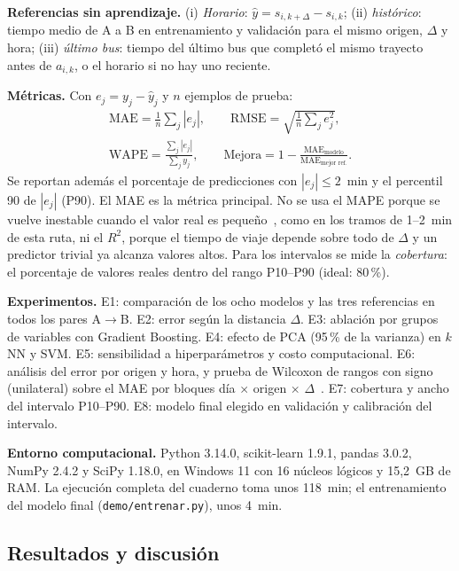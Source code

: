 \documentclass[conference,a4paper]{IEEEtran}
\begin{document}
\textbf{Referencias sin aprendizaje.} (i) \emph{Horario}: $\hat{y} = s_{i,k+\Delta} - s_{i,k}$; (ii) \emph{histórico}: tiempo medio de A a B en entrenamiento y validación para el mismo origen, $\Delta$ y hora; (iii) \emph{último bus}: tiempo del último bus que completó el mismo trayecto antes de $a_{i,k}$, o el horario si no hay uno reciente.

\textbf{Métricas.} Con $e_j = y_j - \hat{y}_j$ y $n$ ejemplos de prueba:
\begin{gather}
\text{MAE} = \tfrac{1}{n}\textstyle\sum_j |e_j|, \qquad
\text{RMSE} = \sqrt{\tfrac{1}{n}\textstyle\sum_j e_j^2},\\
\text{WAPE} = \frac{\sum_j |e_j|}{\sum_j y_j}, \qquad
\text{Mejora} = 1 - \frac{\text{MAE}_{\text{modelo}}}{\text{MAE}_{\text{mejor ref.}}}.
\end{gather}
Se reportan además el porcentaje de predicciones con $|e_j| \le 2$~min y el percentil 90 de $|e_j|$ (P90). El MAE es la métrica principal. No se usa el MAPE porque se vuelve inestable cuando el valor real es pequeño~\cite{hyndman2006}, como en los tramos de 1--2~min de esta ruta, ni el $R^2$, porque el tiempo de viaje depende sobre todo de $\Delta$ y un predictor trivial ya alcanza valores altos. Para los intervalos se mide la \emph{cobertura}: el porcentaje de valores reales dentro del rango P10--P90 (ideal: 80\,\%).

\textbf{Experimentos.} E1: comparación de los ocho modelos y las tres referencias en todos los pares A$\to$B. E2: error según la distancia $\Delta$. E3: ablación por grupos de variables con Gradient Boosting. E4: efecto de PCA (95\,\% de la varianza) en $k$NN y SVM. E5: sensibilidad a hiperparámetros y costo computacional. E6: análisis del error por origen y hora, y prueba de Wilcoxon de rangos con signo (unilateral) sobre el MAE por bloques día $\times$ origen $\times$ $\Delta$~\cite{demsar2006}. E7: cobertura y ancho del intervalo P10--P90. E8: modelo final elegido en validación y calibración del intervalo.

\textbf{Entorno computacional.} Python 3.14.0, scikit-learn 1.9.1, pandas 3.0.2, NumPy 2.4.2 y SciPy 1.18.0, en Windows 11 con 16 núcleos lógicos y 15,2~GB de RAM. La ejecución completa del cuaderno toma unos 118~min; el entrenamiento del modelo final (\texttt{demo/entrenar.py}), unos 4~min.

\subsection{Resultados y discusión}
\end{document}
